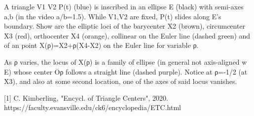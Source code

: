 A triangle V1 V2 P(t) (blue) is inscribed in an ellipse E (black) with semi-axes a,b (in the video a/b=1.5). While V1,V2 are fixed, P(t) slides along E's boundary. Show are the elliptic loci of the barycenter X2 (brown), circumcenter X3 (red), orthocenter X4 (orange), collinear on the Euler line (dashed green) and of an point X(ρ)=X2+ρ(X4-X2) on the Euler line for variable ρ. 

As ρ varies, the locus of X(ρ) is a family of ellipse (in general not axis-aligned w E) whose center Oρ follows a straight line (dashed purple). Notice at ρ=-1/2 (at X3), and also at some second location, one of the axes of said locus vanishes.

[1] C. Kimberling, "Encycl. of Triangle Centers", 2020. https://faculty.evansville.edu/ck6/encyclopedia/ETC.html